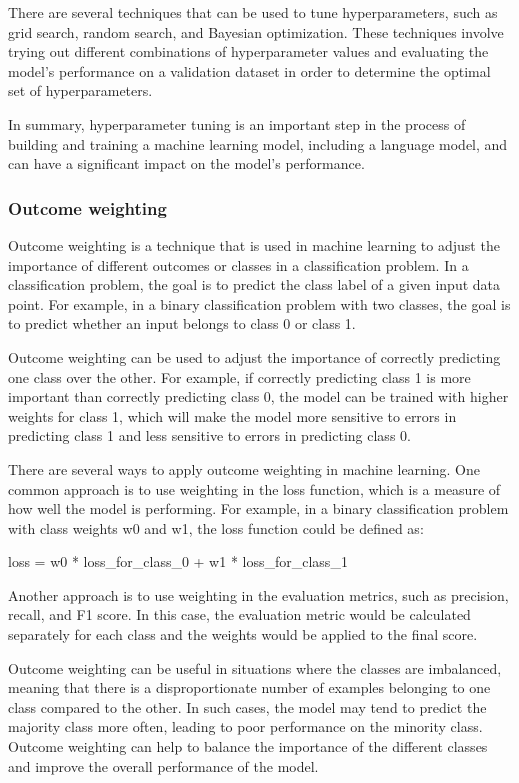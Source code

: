 There are several techniques that can be used to tune hyperparameters, such as grid search, random search, and Bayesian optimization. These techniques involve trying out different combinations of hyperparameter values and evaluating the model's performance on a validation dataset in order to determine the optimal set of hyperparameters.

In summary, hyperparameter tuning is an important step in the process of building and training a machine learning model, including a language model, and can have a significant impact on the model's performance.

\subsubsection{Outcome weighting}
 Outcome weighting is a technique that is used in machine learning to adjust the importance of different outcomes or classes in a classification problem. In a classification problem, the goal is to predict the class label of a given input data point. For example, in a binary classification problem with two classes, the goal is to predict whether an input belongs to class 0 or class 1.

Outcome weighting can be used to adjust the importance of correctly predicting one class over the other. For example, if correctly predicting class 1 is more important than correctly predicting class 0, the model can be trained with higher weights for class 1, which will make the model more sensitive to errors in predicting class 1 and less sensitive to errors in predicting class 0.

There are several ways to apply outcome weighting in machine learning. One common approach is to use weighting in the loss function, which is a measure of how well the model is performing. For example, in a binary classification problem with class weights w0 and w1, the loss function could be defined as:

loss = w0 * loss_for_class_0 + w1 * loss_for_class_1

Another approach is to use weighting in the evaluation metrics, such as precision, recall, and F1 score. In this case, the evaluation metric would be calculated separately for each class and the weights would be applied to the final score.

Outcome weighting can be useful in situations where the classes are imbalanced, meaning that there is a disproportionate number of examples belonging to one class compared to the other. In such cases, the model may tend to predict the majority class more often, leading to poor performance on the minority class. Outcome weighting can help to balance the importance of the different classes and improve the overall performance of the model.

